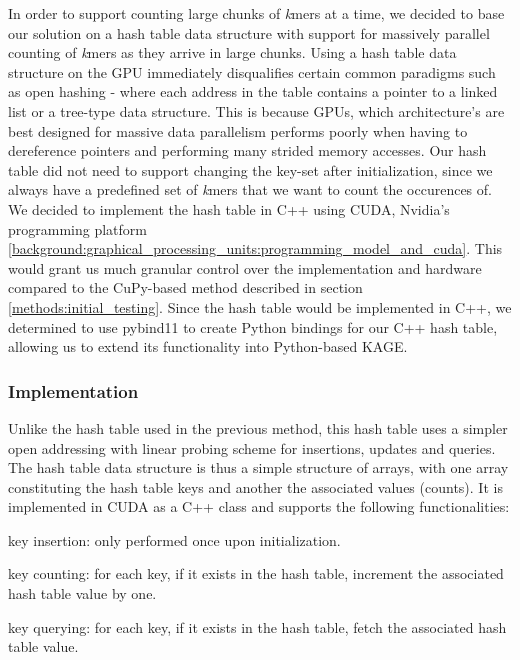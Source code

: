 In order to support counting large chunks of \textit{k}mers at a time, we decided to base our solution on a hash table data structure with support for massively parallel counting of \textit{k}mers as they arrive in large chunks.
Using a hash table data structure on the GPU immediately disqualifies certain common paradigms such as open hashing - where each address in the table contains a pointer to a linked list or a tree-type data structure.
This is because GPUs, which architecture's are best designed for massive data parallelism performs poorly when having to dereference pointers and performing many strided memory accesses.
Our hash table did not need to support changing the key-set after initialization, since we always have a predefined set of \textit{k}mers that we want to count the occurences of.
We decided to implement the hash table in C++ using CUDA, Nvidia's programming platform \ref{background:graphical_processing_units:programming_model_and_cuda}.
This would grant us much granular control over the implementation and hardware compared to the CuPy-based method described in section \ref{methods:initial_testing}.
Since the hash table would be implemented in C++, we determined to use pybind11 \cite{pybind11} to create Python bindings for our C++ hash table, allowing us to extend its functionality into Python-based KAGE.



\subsubsection{Implementation}
Unlike the hash table used in the previous method, this hash table uses a simpler open addressing with linear probing scheme for insertions, updates and queries.
The hash table data structure is thus a simple structure of arrays, with one array constituting the hash table keys and another the associated values (counts).
It is implemented in CUDA as a C++ class and supports the following functionalities:
\begin{compactitem}
  \item key insertion: only performed once upon initialization.
  \item key counting: for each key, if it exists in the hash table, increment the associated hash table value by one.
  \item key querying: for each key, if it exists in the hash table, fetch the associated hash table value.
\end{compactitem}

